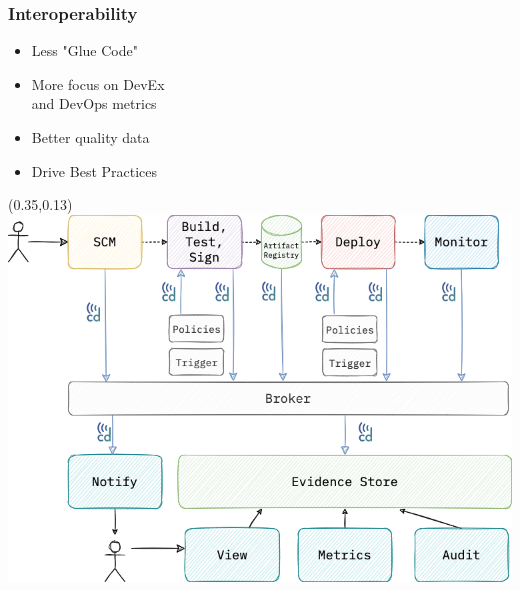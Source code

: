 \documentclass[aspectratio=169,11pt,hyperref={colorlinks=true}]{beamer}
\begin{document}
\begin{grayframe}
  \frametitle{Interoperability}
  \begin{itemize}
    \item Less "Glue Code"
    \item More focus on DevEx \\
          and DevOps metrics
    \item Better quality data
    \item Drive Best Practices
  \end{itemize}
  \begin{textblock*}{0.60\paperwidth}(0.35\paperwidth,0.13\paperheight)
    \includegraphics[width=0.60\paperwidth]{img/cdevents-4-Interoperability.png}
  \end{textblock*}
\end{grayframe}
\end{document}
